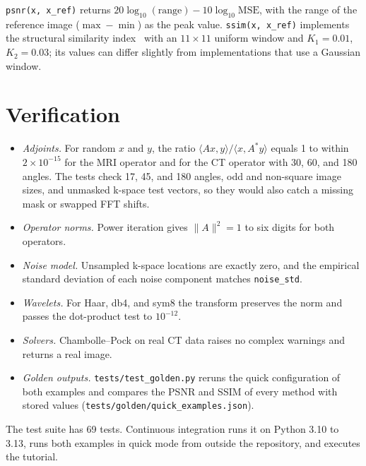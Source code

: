 \documentclass[11pt,a4paper]{article}
\newcommand{\code}[1]{\texttt{#1}}
\begin{document}
\code{psnr(x, x\_ref)} returns $20\log_{10}(\text{range}) -
10\log_{10}\text{MSE}$, with the range of the reference image
($\max-\min$) as the peak value. \code{ssim(x, x\_ref)} implements the
structural similarity index~\cite{WangBovikSheikhSimoncelli2004} with an
$11\times11$ uniform window and $K_1=0.01$, $K_2=0.03$; its values can
differ slightly from implementations that use a Gaussian window.

\section{Verification}\label{sec:verification}

\begin{itemize}
  \item \emph{Adjoints.} For random $x$ and $y$, the ratio
        $\langle Ax,y\rangle/\langle x,A^*y\rangle$ equals 1 to within
        $2\times10^{-15}$ for the MRI operator and for the CT operator with
        30, 60, and 180 angles. The tests check 17, 45, and 180 angles,
        odd and non-square image sizes, and unmasked k-space test vectors,
        so they would also catch a missing mask or swapped FFT shifts.
  \item \emph{Operator norms.} Power iteration gives $\|A\|^2 = 1$ to six
        digits for both operators.
  \item \emph{Noise model.} Unsampled k-space locations are exactly zero,
        and the empirical standard deviation of each noise component matches
        \code{noise\_std}.
  \item \emph{Wavelets.} For Haar, db4, and sym8 the transform preserves the
        norm and passes the dot-product test to $10^{-12}$.
  \item \emph{Solvers.} Chambolle--Pock on real CT data raises no complex
        warnings and returns a real image.
  \item \emph{Golden outputs.} \code{tests/test\_golden.py} reruns the quick
        configuration of both examples and compares the PSNR and SSIM of
        every method with stored values (\code{tests/golden/quick\_examples.json}).
\end{itemize}
The test suite has 69 tests. Continuous integration runs it on Python 3.10
to 3.13, runs both examples in quick mode from outside the repository, and
executes the tutorial.

\end{document}

